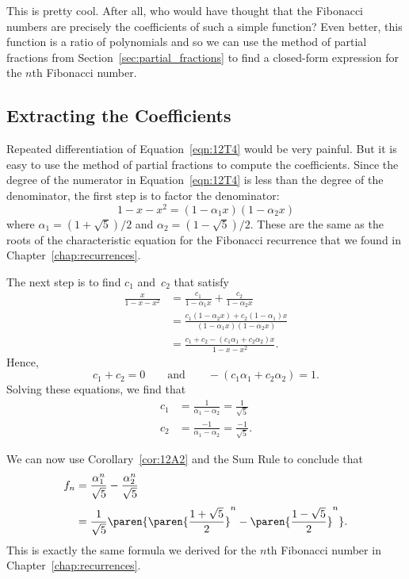 This is pretty cool.  After all, who would have thought that the
Fibonacci numbers are precisely the coefficients of such a simple
function?  Even better, this function is a ratio of polynomials and so
we can use the method of partial fractions from
Section~\ref{sec:partial_fractions} to find a closed-form
expression for the $n$th Fibonacci number.

\subsection{Extracting the Coefficients}

Repeated differentiation of Equation~\ref{eqn:12T4} would be very
painful.  But it is easy to use the method of partial fractions to
compute the coefficients.  Since the degree of the numerator in
Equation~\ref{eqn:12T4} is less than the degree of the denominator,
the first step is to factor the denominator:
\begin{equation*}
    1 - x - x^2 = (1 - \alpha_1 x) (1 - \alpha_2 x)
\end{equation*}
where $\alpha_1 = (1 + \sqrt{5})/2$ and $\alpha_2 = (1 - \sqrt{5})/2$.
These are the same as the roots of the characteristic equation for the
Fibonacci recurrence that we found in Chapter~\ref{chap:recurrences}.

The next step is to find $c_1$ and~$c_2$ that satisfy
\begingroup
\openup 3pt
\begin{align*}
\frac{x}{1 - x - x^2}
    &= \frac{c_1}{1 - \alpha_1 x} + \frac{c_2}{1 - \alpha_2 x} \\
    &= \frac{c_1 (1 - \alpha_2 x) + c_2 (1 - \alpha_1) x}
            {(1 - \alpha_1 x) (1 - \alpha_2 x)} \\
    &= \frac{c_1 + c_2 - (c_1 \alpha_1 + c_2 \alpha_2) x}
            {1 - x - x^2}.
\end{align*}
\endgroup
Hence,
\begin{equation*}
    c_1 + c_2 = 0
    \qquad\text{and}\qquad
    - (c_1 \alpha_1 + c_2 \alpha_2) = 1.
\end{equation*}
Solving these equations, we find that
\begin{align*}
    c_1 &= \frac{1}{\alpha_1 - \alpha_2} = \frac{1}{\sqrt{5}} \\
    c_2 &= \frac{-1}{\alpha_1 - \alpha_2} = \frac{-1}{\sqrt{5}}.
\end{align*}

We can now use Corollary~\ref{cor:12A2} and the Sum Rule to conclude
that
\begin{align*}
f_n &= \frac{\alpha_1^n}{\sqrt{5}} - \frac{\alpha_2^n}{\sqrt{5}} \\[3pt]
    &= \frac{1}{\sqrt{5}}
        \paren{
            \paren{\frac{1 + \sqrt{5}}{2}}^n - \paren{\frac{1 - \sqrt{5}}{2}}^n
        }.
\end{align*}
This is exactly the same formula we derived for the $n$th Fibonacci
number in Chapter~\ref{chap:recurrences}.

